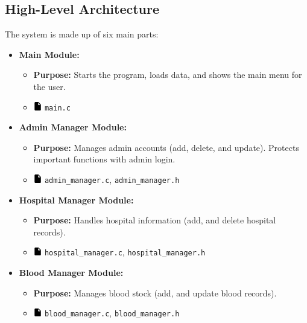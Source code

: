 \documentclass[12pt,a4paper]{report}
\begin{document}
\subsection{High-Level Architecture}
The system is made up of six main parts:
\begin{itemize}
    \item \normalsize \textbf{Main Module:}
    \begin{itemize}
        \item \normalsize \textbf{Purpose:} Starts the program, loads data, and shows the main menu for the user.
        \item \includegraphics[width=0.03\textwidth]{../resources/assets/images/file_icon.png} \texttt{main.c}
    \end{itemize}
    \item \normalsize \textbf{Admin Manager Module:}
    \begin{itemize}
        \item \normalsize \textbf{Purpose:} Manages admin accounts (add, delete, and update). Protects important functions with admin login.
        \item \includegraphics[width=0.03\textwidth]{../resources/assets/images/file_icon.png} \texttt{admin\_manager.c}, \texttt{admin\_manager.h}
    \end{itemize}
    \item \normalsize \textbf{Hospital Manager Module:}
    \begin{itemize}
        \item \normalsize \textbf{Purpose:} Handles hospital information (add, and delete hospital records).
        \item \includegraphics[width=0.03\textwidth]{../resources/assets/images/file_icon.png} \texttt{hospital\_manager.c}, \texttt{hospital\_manager.h}
    \end{itemize}
    \item \normalsize \textbf{Blood Manager Module:}
    \begin{itemize}
        \item \normalsize \textbf{Purpose:} Manages blood stock (add, and update blood records).
        \item \includegraphics[width=0.03\textwidth]{../resources/assets/images/file_icon.png} \texttt{blood\_manager.c}, \texttt{blood\_manager.h}

\end{itemize}
\end{itemize}
\end{document}
